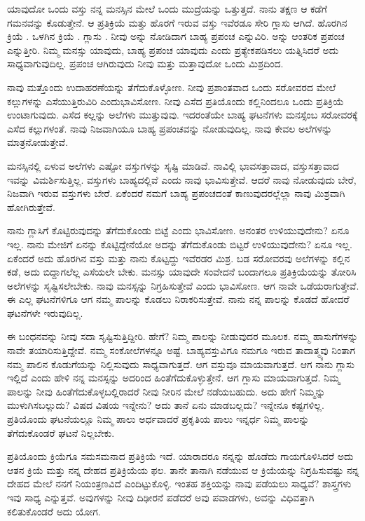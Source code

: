 ಯಾವುದೋ ಒಂದು ವಸ್ತು ನನ್ನ ಮನಸ್ಸಿನ ಮೇಲೆ ಒಂದು ಮುದ್ರೆಯನ್ನು ಒತ್ತುತ್ತದೆ. ನಾನು ತಕ್ಷಣ ಆ ಕಡೆಗೆ ಗಮನವನ್ನು ಕೊಡುತ್ತೇನೆ. ಆ ಪ್ರತಿಕ್ರಿಯೆ ಮತ್ತು ಹೊರಗೆ ಇರುವ ವಸ್ತು ಇವೆರಡೂ ಸೇರಿ ಗ್ಲಾಸು ಆಗಿದೆ. ಹೊರಗಿನ ಕ್ರಿಯೆ . ಒಳಗಿನ ಕ್ರಿಯೆ . ಗ್ಲಾಸು . ನೀವು  ಅನ್ನು ನೋಡಿದಾಗ ಬಾಹ್ಯ ಪ್ರಪಂಚ ಎನ್ನುವಿರಿ.  ಅನ್ನು ಆಂತರಿಕ ಪ್ರಪಂಚ ಎನ್ನುತ್ತೀರಿ. ನಿಮ್ಮ ಮನಸ್ಸು ಯಾವುದು, ಬಾಹ್ಯ ಪ್ರಪಂಚ ಯಾವುದು ಎಂದು ಪ್ರತ್ಯೇಕಪಡಿಸಲು ಯತ್ನಿಸಿದರೆ ಅದು ಸಾಧ್ಯವಾಗುವುದಿಲ್ಲ. ಪ್ರಪಂಚ ಆಗಿರುವುದು ನೀವು ಮತ್ತು ಮತ್ತಾವುದೋ ಒಂದು ಮಿಶ್ರದಿಂದ.

ನಾವು ಮತ್ತೊಂದು ಉದಾಹರಣೆಯನ್ನು ತೆಗೆದುಕೊಳ್ಳೋಣ. ನೀವು ಪ್ರಶಾಂತವಾದ ಒಂದು ಸರೋವರದ ಮೇಲೆ ಕಲ್ಲುಗಳನ್ನು ಎಸೆಯುತ್ತಿರುವಿರಿ ಎಂದು\break ಭಾವಿಸೋಣ. ನೀವು ಎಸೆದ ಪ್ರತಿಯೊಂದು ಕಲ್ಲಿನಿಂದಲೂ ಒಂದು ಪ್ರತಿಕ್ರಿಯೆ ಉಂಟಾಗುವುದು. ಎಸೆದ ಕಲ್ಲನ್ನು ಅಲೆಗಳು ಮುತ್ತುವುವು. ಇದರಂತೆಯೇ ಬಾಹ್ಯ ಘಟನೆಗಳು ಮನಸ್ಸೆಂಬ ಸರೋವರಕ್ಕೆ ಎಸೆದ ಕಲ್ಲುಗಳಂತೆ. ನಾವು ನಿಜವಾಗಿಯೂ ಬಾಹ್ಯ ಪ್ರಪಂಚವನ್ನು ನೋಡುವುದಿಲ್ಲ. ನಾವು ಕೇವಲ ಅಲೆಗಳನ್ನು ಮಾತ್ರ\break ನೋಡುತ್ತೇವೆ.

ಮನಸ್ಸಿನಲ್ಲಿ ಏಳುವ ಅಲೆಗಳು ಎಷ್ಟೋ ವಸ್ತುಗಳನ್ನು ಸೃಷ್ಟಿ ಮಾಡಿವೆ. ನಾವಿಲ್ಲಿ ಭಾವಸತ್ತಾವಾದ, ವಸ್ತುಸತ್ತಾವಾದ ಇವನ್ನು ವಿಮರ್ಶಿಸುತ್ತಿಲ್ಲ. ವಸ್ತುಗಳು ಬಾಹ್ಯದಲ್ಲಿವೆ ಎಂದು ನಾವು ಭಾವಿಸುತ್ತೇವೆ. ಆದರೆ ನಾವು ನೋಡುವುದು ಬೇರೆ, ನಿಜವಾಗಿ ಇರುವ ವಸ್ತುಗಳು ಬೇರೆ. ಏಕೆಂದರೆ ನಮಗೆ ಬಾಹ್ಯ ಪ್ರಪಂಚದಂತೆ ಕಾಣುವುದರಲ್ಲೆಲ್ಲಾ ನಾವು ಮಿಶ್ರವಾಗಿ ಹೋಗಿರುತ್ತೇವೆ.

ನಾನು ಗ್ಲಾಸಿಗೆ ಕೊಟ್ಟಿರುವುದನ್ನು ತೆಗೆದುಕೊಂಡು ಬಿಟ್ಟೆ ಎಂದು ಭಾವಿಸೋಣ. ಅನಂತರ ಉಳಿಯುವುದೇನು? ಏನೂ ಇಲ್ಲ. ನಾನು ಮೇಜಿಗೆ ಏನನ್ನು ಕೊಟ್ಟಿದ್ದೇನೆಯೋ ಅದನ್ನು ತೆಗೆದುಕೊಂಡು ಬಿಟ್ಟರೆ ಉಳಿಯುವುದೇನು? ಏನೂ ಇಲ್ಲ. ಏಕೆಂದರೆ ಅದು ಹೊರಗಿನ ವಸ್ತು ಮತ್ತು ನಾನು ಕೊಟ್ಟದ್ದು ಇವೆರಡರ ಮಿಶ್ರ. ಬಡ ಸರೋವರವು ಅಲೆಗಳನ್ನು ಕಲ್ಲಿನ ಕಡೆ, ಅದು ಬಿದ್ದಾಗಲೆಲ್ಲ ಎಸೆಯಲೇ ಬೇಕು. ಮನಸ್ಸು ಯಾವುದೇ ಸಂವೇದನೆ ಬಂದಾಗಲೂ ಪ್ರತಿಕ್ರಿಯೆಯನ್ನು ತೋರಿಸಿ ಅಲೆಗಳನ್ನು ಸೃಷ್ಟಿಸಲೇಬೇಕು. ನಾವು ಮನಸ್ಸನ್ನು ನಿಗ್ರಹಿಸುತ್ತೇವೆ ಎಂದು ಭಾವಿಸೋಣ. ಆಗ ನಾವೇ ಒಡೆಯರಾಗುತ್ತೇವೆ. ಈ ಎಲ್ಲ ಘಟನೆಗಳಿಗೂ ಆಗ ನಮ್ಮ ಪಾಲನ್ನು ಕೊಡಲು ನಿರಾಕರಿಸುತ್ತೇವೆ. ನಾನು ನನ್ನ ಪಾಲನ್ನು ಕೊಡದೆ ಹೋದರೆ ಘಟನೆಗಳೇ ಇರುವುದಿಲ್ಲ.

ಈ ಬಂಧನವನ್ನು ನೀವು ಸದಾ ಸೃಷ್ಟಿಸುತ್ತಿದ್ದೀರಿ. ಹೇಗೆ? ನಿಮ್ಮ ಪಾಲನ್ನು ನೀಡುವುದರ ಮೂಲಕ. ನಮ್ಮ ಹಾಸುಗೆಗಳನ್ನು ನಾವೇ ತಯಾರಿಸುತ್ತಿದ್ದೇವೆ. ನಮ್ಮ ಸಂಕೋಲೆಗಳನ್ನೂ ಅಷ್ಟೆ. ಬಾಹ್ಯವಸ್ತುವಿಗೂ ನಮಗೂ ಇರುವ ತಾದಾತ್ಮ್ಯವು ನಿಂತಾಗ ನಮ್ಮ ಪಾಲಿನ ಕೊಡುಗೆಯನ್ನು ನಿಲ್ಲಿಸುವುದು ಸಾಧ್ಯವಾಗುತ್ತದೆ. ಆಗ ವಸ್ತುವೂ ಮಾಯವಾಗುತ್ತದೆ. ಆಗ ನಾನು ಗ್ಲಾಸು ಇಲ್ಲಿದೆ ಎಂದು ಹೇಳಿ ನನ್ನ ಮನಸ್ಸನ್ನು ಅದರಿಂದ ಹಿಂತೆಗೆದುಕೊಳ್ಳುತ್ತೇನೆ. ಆಗ ಗ್ಲಾಸು ಮಾಯವಾಗುತ್ತದೆ. ನಿಮ್ಮ ಪಾಲನ್ನು ನೀವು ಹಿಂತೆಗೆದುಕೊಳ್ಳಬಲ್ಲಿರಾದರೆ ನೀವು ನೀರಿನ ಮೇಲೆ ನಡೆಯಬಹುದು. ಅದು ಹೇಗೆ ನಿಮ್ಮನ್ನು ಮುಳುಗಿಸಬಲ್ಲುದು? ವಿಷದ ವಿಷಯ ಇನ್ನೇನು? ಅದು ತಾನೆ ಏನು ಮಾಡಬಲ್ಲದು? ಇನ್ನೇನೂ ಕಷ್ಟಗಳಿಲ್ಲ. ಪ್ರತಿಯೊಂದು ಘಟನೆಯಲ್ಲೂ ನಿಮ್ಮ ಪಾಲು ಅರ್ಧವಾದರೆ ಪ್ರಕೃತಿಯ ಪಾಲು ಇನ್ನರ್ಧ ನಿಮ್ಮ ಪಾಲನ್ನು ತೆಗೆದುಕೊಂಡರೆ ಘಟನೆ ನಿಲ್ಲಬೇಕು.

ಪ್ರತಿಯೊಂದು ಕ್ರಿಯೆಗೂ ಸಮಸಮನಾದ ಪ್ರತಿಕ್ರಿಯೆ ಇದೆ. ಯಾರಾದರೂ ನನ್ನನ್ನು ಹೊಡೆದು ಗಾಯಗೊಳಿಸಿದರೆ ಅದು ಆತನ ಕ್ರಿಯೆ ಮತ್ತು ನನ್ನ ದೇಹದ ಪ್ರತಿಕ್ರಿಯೆಯ ಫಲ. ತಾನೇ ತಾನಾಗಿ ನಡೆಯುವ ಆ ಕ್ರಿಯೆಯನ್ನು ನಿಗ್ರಹಿಸುವಷ್ಟು ನನ್ನ ದೇಹದ ಮೇಲೆ ನನಗೆ ನಿಯಂತ್ರಣವಿದೆ ಎಂದಿಟ್ಟುಕೊಳ್ಳಿ. ಇಂತಹ ಶಕ್ತಿಯನ್ನು ನಾವು ಪಡೆಯಲು ಸಾಧ್ಯವೆ? ಶಾಸ್ತ್ರಗಳು ಇವು ಸಾಧ್ಯ ಎನ್ನುತ್ತವೆ. ಅವುಗಳನ್ನು ನೀವು ದಿಢೀರನೆ ಪಡೆದರೆ ಅವು ಪವಾಡಗಳು, ಅವನ್ನು ವಿಧಿವತ್ತಾಗಿ ಕಲಿತುಕೊಂಡರೆ ಅದು ಯೋಗ.

